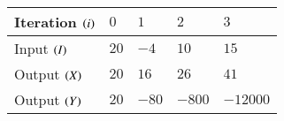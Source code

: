 \begin{tabular}{|l|l|l|l|l|}
   \hline
    Iteration $\left(i\right)$ & $0$ & $1$ & $2$ & $3$  \\
    \hline
    Input $\left(I\right)$ &  $20$ & $-4$ & $10$ & $15$ \\
    \hline
    Output $\left(X\right)$ &  $20$ & $16$ & $26$ & $41$ \\
    \hline
    Output $\left(Y\right)$ &  $20$ & $-80$ & $-800$ & $-12000$ \\
    \hline
\end{tabular}